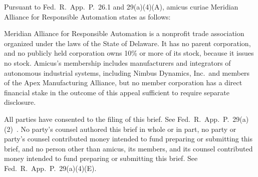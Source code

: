 
\setcounter{page}{2}
\thispagestyle{plain}


\noindent Pursuant to Fed.\ R.\ App.\ P.\ 26.1 and 29(a)(4)(A), amicus curiae Meridian Alliance for Responsible Automation states as follows:

\medskip
\noindent Meridian Alliance for Responsible Automation is a nonprofit trade association organized under the laws of the State of Delaware. It has no parent corporation, and no publicly held corporation owns 10\% or more of its stock, because it issues no stock. Amicus's membership includes manufacturers and integrators of autonomous industrial systems, including Nimbus Dynamics, Inc.\ and members of the Apex Manufacturing Alliance, but no member corporation has a direct financial stake in the outcome of this appeal sufficient to require separate disclosure.

\bigskip
{}

\noindent All parties have consented to the filing of this brief. See Fed.\ R.\ App.\ P.\ 29(a)(2)~\cite{fraprule29}. No party's counsel authored this brief in whole or in part, no party or party's counsel contributed money intended to fund preparing or submitting this brief, and no person other than amicus, its members, and its counsel contributed money intended to fund preparing or submitting this brief. See Fed.\ R.\ App.\ P.\ 29(a)(4)(E).
